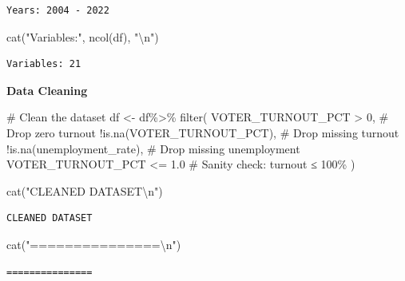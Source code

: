 \documentclass[
  11pt,
]{article}
\newenvironment{Shaded}{\begin{snugshade}}{\end{snugshade}}
\newcommand{\CommentTok}[1]{\textcolor[rgb]{0.37,0.37,0.37}{#1}}
\newcommand{\DecValTok}[1]{\textcolor[rgb]{0.68,0.00,0.00}{#1}}
\newcommand{\FloatTok}[1]{\textcolor[rgb]{0.68,0.00,0.00}{#1}}
\newcommand{\FunctionTok}[1]{\textcolor[rgb]{0.28,0.35,0.67}{#1}}
\newcommand{\NormalTok}[1]{\textcolor[rgb]{0.00,0.23,0.31}{#1}}
\newcommand{\OtherTok}[1]{\textcolor[rgb]{0.00,0.23,0.31}{#1}}
\newcommand{\SpecialCharTok}[1]{\textcolor[rgb]{0.37,0.37,0.37}{#1}}
\newcommand{\StringTok}[1]{\textcolor[rgb]{0.13,0.47,0.30}{#1}}
\begin{document}
\begin{verbatim}
Years: 2004 - 2022 
\end{verbatim}

\begin{Shaded}
\begin{Highlighting}[]
\FunctionTok{cat}\NormalTok{(}\StringTok{"Variables:"}\NormalTok{, }\FunctionTok{ncol}\NormalTok{(df), }\StringTok{"}\SpecialCharTok{\textbackslash{}n}\StringTok{"}\NormalTok{)}
\end{Highlighting}
\end{Shaded}

\begin{verbatim}
Variables: 21 
\end{verbatim}

\textbf{Data Cleaning}

\begin{Shaded}
\begin{Highlighting}[]
\CommentTok{\# Clean the dataset}
\NormalTok{df }\OtherTok{\textless{}{-}}\NormalTok{ df}\SpecialCharTok{\%\textgreater{}\%}
  \FunctionTok{filter}\NormalTok{(}
\NormalTok{    VOTER\_TURNOUT\_PCT }\SpecialCharTok{\textgreater{}} \DecValTok{0}\NormalTok{,           }\CommentTok{\# Drop zero turnout}
    \SpecialCharTok{!}\FunctionTok{is.na}\NormalTok{(VOTER\_TURNOUT\_PCT),       }\CommentTok{\# Drop missing turnout}
    \SpecialCharTok{!}\FunctionTok{is.na}\NormalTok{(unemployment\_rate),        }\CommentTok{\# Drop missing unemployment}
\NormalTok{    VOTER\_TURNOUT\_PCT }\SpecialCharTok{\textless{}=} \FloatTok{1.0}         \CommentTok{\# Sanity check: turnout ≤ 100\%}
\NormalTok{  )}

\FunctionTok{cat}\NormalTok{(}\StringTok{"CLEANED DATASET}\SpecialCharTok{\textbackslash{}n}\StringTok{"}\NormalTok{)}
\end{Highlighting}
\end{Shaded}

\begin{verbatim}
CLEANED DATASET
\end{verbatim}

\begin{Shaded}
\begin{Highlighting}[]
\FunctionTok{cat}\NormalTok{(}\StringTok{"===============}\SpecialCharTok{\textbackslash{}n}\StringTok{"}\NormalTok{)}
\end{Highlighting}
\end{Shaded}

\begin{verbatim}
===============
\end{verbatim}
\end{document}
